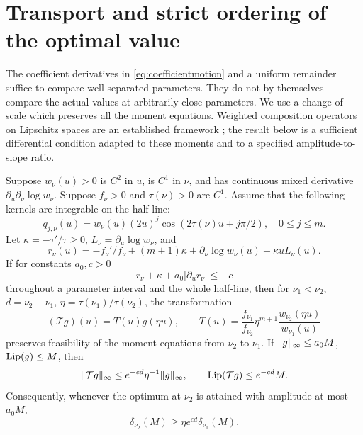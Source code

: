 \section{Transport and strict ordering of the optimal value}\label{sec:transport}
The coefficient derivatives in \eqref{eq:coefficientmotion} and a uniform
remainder suffice to compare well-separated parameters. They do not by
themselves compare the actual values at arbitrarily close parameters.
We use a change of scale which preserves all the moment equations.
Weighted composition operators on Lipschitz spaces are an established
framework \cite{abbar}; the result below is a sufficient differential
condition adapted to these moments and to a specified amplitude-to-slope
ratio.

\begin{theorem}\label{thm:transport}
Suppose \(w_\nu(u)>0\) is \(C^2\) in \(u\), is \(C^1\) in \(\nu\),
and has continuous mixed derivative \(\partial_u\partial_\nu\log w_\nu\).
Suppose \(f_\nu>0\) and \(\tau(\nu)>0\) are \(C^1\).
Assume that the following kernels are integrable on the half-line:
\[
 q_{j,\nu}(u)=w_\nu(u)(2u)^j
                 \cos(2\tau(\nu)u+j\pi/2),\quad 0\leq j\leq m .
\]
Let \(\kappa=-\tau'/\tau\geq0\), \(L_\nu=\partial_u\log w_\nu\), and
\[
 r_\nu(u)=-f_\nu'/f_\nu+(m+1)\kappa
               +\partial_\nu\log w_\nu(u)+\kappa uL_\nu(u).
\]
If for constants \(a_0,c>0\)
\begin{equation}\label{eq:transportcriterion}
 r_\nu+\kappa+a_0|\partial_ur_\nu|\leq-c
\end{equation}
throughout a parameter interval and the whole half-line, then for
\(\nu_1<\nu_2\), \(d=\nu_2-\nu_1\), \(\eta=\tau(\nu_1)/\tau(\nu_2)\),
the transformation
\begin{equation}\label{eq:transportmap}
 (\mathcal T g)(u)=T(u)g(\eta u),\qquad
 T(u)=\frac{f_{\nu_1}}{f_{\nu_2}}\eta^{m+1}
                 \frac{w_{\nu_2}(\eta u)}{w_{\nu_1}(u)}
\end{equation}
preserves feasibility of the moment equations from \(\nu_2\) to \(\nu_1\).
If \(\lVert g\rVert_\infty\leq a_0M\), \(\operatorname{Lip}(g)\leq M\), then
\[
 \lVert\mathcal T g\rVert_\infty\leq e^{-cd}\eta^{-1}\lVert g\rVert_\infty,
 \qquad \operatorname{Lip}(\mathcal T g)\leq e^{-cd}M .
\]
Consequently, whenever the optimum at \(\nu_2\) is attained with
amplitude at most \(a_0M\),
\begin{equation}\label{eq:order}
 \delta_{\nu_2}(M)\geq\eta e^{cd}\delta_{\nu_1}(M).
\end{equation}
\end{theorem}

